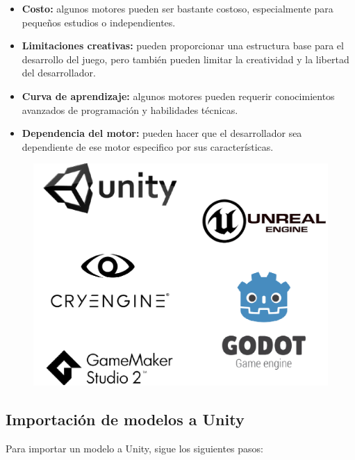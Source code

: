 \begin{itemize}
	\item \textbf{Costo:} algunos motores pueden ser bastante costoso, especialmente para pequeños estudios o independientes.
	
	\item \textbf{Limitaciones creativas:} pueden proporcionar una estructura base para el desarrollo del juego, pero también pueden limitar la creatividad y la libertad del desarrollador.
	
	\item \textbf{Curva de aprendizaje:} algunos motores pueden requerir conocimientos avanzados de programación y habilidades técnicas.
	
	\item \textbf{Dependencia del motor:} pueden hacer que el desarrollador sea dependiente de ese motor especifico por sus características.
\end{itemize}

\begin{figure}[!ht]
	\centering
	\includegraphics[scale=0.7]{Imágenes/motor.png}
\end{figure}
\newpage
\subsection{Importación de modelos a Unity}

Para importar un modelo a Unity, sigue los siguientes pasos:

